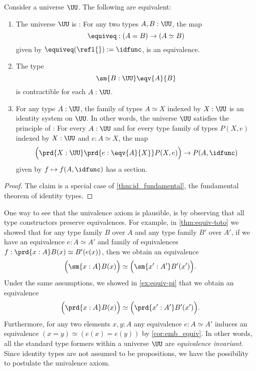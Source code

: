 \begin{thm}\label{thm:univalence}
Consider a universe $\UU$. The following are equivalent:
\begin{enumerate}
\item The universe $\UU$ is : For any two types $A,B:\UU$, the map
  \begin{equation*}
    \equiveq:(A=B)\to (A\simeq B)
  \end{equation*}
  given by $\equiveq(\refl{}):=\idfunc$, is an equivalence.
\item The type
\begin{equation*}
\sm{B:\UU}\eqv{A}{B}
\end{equation*}
is contractible for each $A:\UU$.
\item For any type $A:\UU$, the family of types $A\simeq X$ indexed by $X:\UU$ is an identity system on $\UU$. In other words, the universe $\UU$ satisfies the principle of : For every $A:\UU$ and for every type family of types $P(X,e)$ indexed by $X:\UU$ and $e:A\simeq X$, the map
\begin{equation*}
\Big(\prd{X:\UU}\prd{e:\eqv{A}{X}}P(X,e)\Big)\to P(A,\idfunc)
\end{equation*}
given by $f\mapsto f(A,\idfunc)$ has a section.
\end{enumerate}
\end{thm}

\begin{proof}
  The claim is a special case of \cref{thm:id_fundamental}, the fundamental theorem of identity types.
\end{proof}

One way to see that the univalence axiom is plausible, is by observing that all type constructors preserve equivalences. For example, in \cref{thm:equiv-toto} we showed that for any type family $B$ over $A$ and any type family $B'$ over $A'$, if we have an equivalence $e:A\simeq A'$ and family of equivalences $f:\prd{x:A}B(x)\simeq B'(e(x))$, then we obtain an equivalence
\begin{equation*}
  \Big(\sm{x:A}B(x)\Big)\simeq\Big(\sm{x':A'}B'(x')\Big).
\end{equation*}
Under the same assumptions, we showed in \cref{ex:equiv-pi} that we obtain an equivalence
\begin{equation*}
  \Big(\prd{x:A}B(x)\Big)\simeq\Big(\prd{x':A'}B'(x')\Big).
\end{equation*}
Furthermore, for any two elements $x,y:A$ any equivalence $e:A\simeq A'$ induces an equivalence $(x=y)\simeq (e(x)=e(y))$ by \cref{cor:emb_equiv}. In other words, all the standard type formers within a universe $\UU$ are \emph{equivalence invariant}. Since identity types are not assumed to be propositions, we have the possibility to postulate the univalence axiom.

